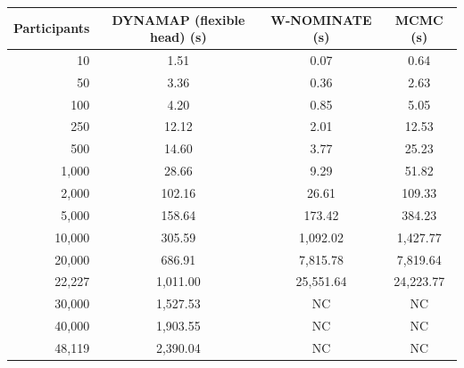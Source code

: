 \begin{tabular}{rccc}
\toprule
Participants & DYNAMAP (flexible head) (s) & W-NOMINATE (s) & MCMC (s) \\
\midrule
10 & 1.51 & 0.07 & 0.64 \\
50 & 3.36 & 0.36 & 2.63 \\
100 & 4.20 & 0.85 & 5.05 \\
250 & 12.12 & 2.01 & 12.53 \\
500 & 14.60 & 3.77 & 25.23 \\
1,000 & 28.66 & 9.29 & 51.82 \\
2,000 & 102.16 & 26.61 & 109.33 \\
5,000 & 158.64 & 173.42 & 384.23 \\
10,000 & 305.59 & 1,092.02 & 1,427.77 \\
20,000 & 686.91 & 7,815.78 & 7,819.64 \\
22,227 & 1,011.00 & 25,551.64 & 24,223.77 \\
30,000 & 1,527.53 & NC & NC \\
40,000 & 1,903.55 & NC & NC \\
48,119 & 2,390.04 & NC & NC \\
\bottomrule
\end{tabular}
